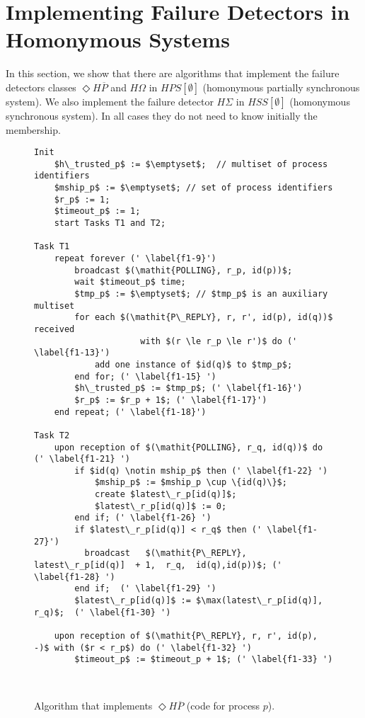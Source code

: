 \documentclass[10pt, conference, compsocconf]{IEEEtran}
\newcommand{\HO}{{H\Omega}}
\newcommand{\HS}{{H\Sigma}}
\newcommand{\HP}{{ \Diamond H\overline{P}}}
\begin{document}
\section{Implementing Failure Detectors in  Homonymous Systems}
\label{appendix:FDs-implementation}

In this section, we show that there are algorithms that implement 
the failure detectors classes $\HP$ and $\HO$ in $HPS[\emptyset]$
 (homonymous partially synchronous system). We also implement the 
failure detector $\HS$ in $HSS[\emptyset]$ (homonymous synchronous system).
 In all cases they do not need to know initially the membership. 






\begin{figure}
\begin{lstlisting}
Init
	$h\_trusted_p$ := $\emptyset$;  // multiset of process identifiers
	$mship_p$ := $\emptyset$; // set of process identifiers
	$r_p$ := 1;
	$timeout_p$ := 1;
	start Tasks T1 and T2;

Task T1
	repeat forever (' \label{f1-9}')
		broadcast $(\mathit{POLLING}, r_p, id(p))$;
		wait $timeout_p$ time;
		$tmp_p$ := $\emptyset$; // $tmp_p$ is an auxiliary multiset
		for each $(\mathit{P\_REPLY}, r, r', id(p), id(q))$ received 
		             with $(r \le r_p \le r')$ do (' \label{f1-13}')
			add one instance of $id(q)$ to $tmp_p$;
		end for; (' \label{f1-15} ')
		$h\_trusted_p$ := $tmp_p$; (' \label{f1-16}')
		$r_p$ := $r_p + 1$; (' \label{f1-17}')
	end repeat; (' \label{f1-18}')

Task T2	
	upon reception of $(\mathit{POLLING}, r_q, id(q))$ do (' \label{f1-21} ')
		if $id(q) \notin mship_p$ then (' \label{f1-22} ')
			$mship_p$ := $mship_p \cup \{id(q)\}$;
			create $latest\_r_p[id(q)]$;
			$latest\_r_p[id(q)]$ := 0;
		end if; (' \label{f1-26} ')
		if $latest\_r_p[id(q)] < r_q$ then (' \label{f1-27}')
		  broadcast   $(\mathit{P\_REPLY},  latest\_r_p[id(q)]  + 1,  r_q,  id(q),id(p))$; (' \label{f1-28} ')
		end if;  (' \label{f1-29} ')
		$latest\_r_p[id(q)]$ := $\max(latest\_r_p[id(q)], r_q)$;  (' \label{f1-30} ')
	
	upon reception of $(\mathit{P\_REPLY}, r, r', id(p), -)$ with ($r < r_p$) do (' \label{f1-32} ')
		$timeout_p$ := $timeout_p + 1$; (' \label{f1-33} ')
		
	

\end{lstlisting}		
\caption{Algorithm that implements $\HP$ (code for process $p$).}
\label{Fig-HP}
\end{figure}
\end{document}
